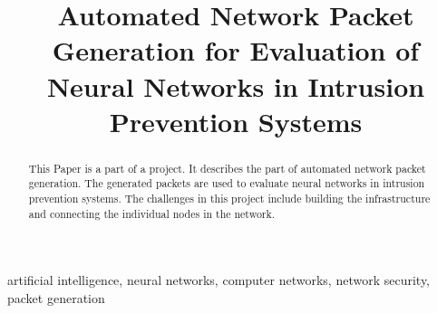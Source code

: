 \documentclass[conference]{IEEEtran}
\begin{document}
\title{Automated Network Packet Generation for Evaluation of Neural Networks in Intrusion Prevention Systems}

\author{
\and
{}
\and
{}
}

\maketitle

\begin{abstract}
This Paper is a part of a project. It describes the part of automated network packet generation. The generated packets are used to evaluate neural networks in intrusion prevention systems. The challenges in this project include building the infrastructure and connecting the individual nodes in the network.
\end{abstract}

\begin{IEEEkeywords}
artificial intelligence, neural networks, computer networks, network security, packet generation
\end{IEEEkeywords}
\end{document}
